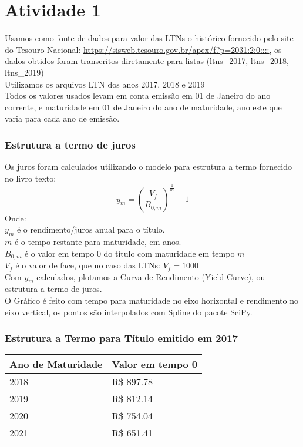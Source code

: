 \documentclass[
	11pt,				%
	openright,			%
	oneside,			%
	a4paper,			%
	english,			%
	french,				%
	spanish,			%
	brazil,				%
	]{abntex2}
\begin{document}
\chapter{Atividade 1}
Usamos como fonte de dados para valor das LTNs o histórico fornecido pelo site do Tesouro Nacional: \url{https://sisweb.tesouro.gov.br/apex/f?p=2031:2:0::::}, os dados obtidos foram transcritos diretamente para listas (ltns\_2017, ltns\_2018, ltns\_2019)\\
Utilizamos os arquivos LTN dos anos 2017, 2018 e 2019\\
Todos os valores usados levam em conta emissão em 01 de Janeiro do ano corrente, e maturidade em 01 de Janeiro do ano de maturidade, ano este que varia para cada ano de emissão.\\

\subsection{Estrutura a termo de juros}
Os juros foram calculados utilizando o modelo para estrutura a termo fornecido no livro texto:
\[
y_m = \left(\frac{V_f}{B_{0,m}}\right)^\frac{1}{m} - 1
\]
Onde:\\
\(y_m\) é o rendimento/juros anual para o título. \\
\(m\) é o tempo restante para maturidade, em anos.\\
\(B_{0,m}\) é o valor em tempo 0 do título com maturidade em tempo \(m\)\\
\(V_f\) é o valor de face, que no caso das LTNs: \(V_f = 1000\)
\\
Com \(y_m\) calculados, plotamos a Curva de Rendimento (Yield Curve), ou estrutura a termo de juros.\\
O Gráfico é feito com tempo para maturidade no eixo horizontal e rendimento no eixo vertical, os pontos são interpolados com Spline do pacote SciPy.

\newpage
\subsection{Estrutura a Termo para Título emitido em 2017}
\begin{tabular}{ll}
\toprule
\multicolumn{1}{c}{Ano de Maturidade} & Valor em tempo 0 \\
\midrule
2018 & R\$ 897.78 \\
2019 & R\$ 812.14 \\
2020 & R\$ 754.04\\
2021 & R\$ 651.41
\end{tabular}
\begin{figure}[h]
\end{figure}
\end{document}
